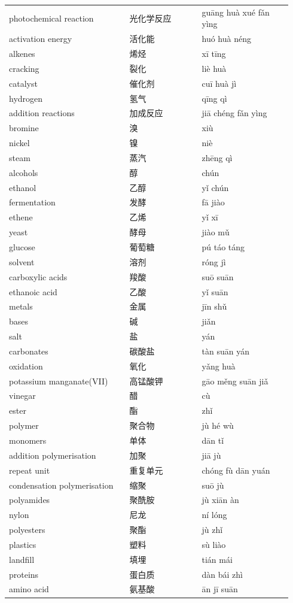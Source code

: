 \documentclass[11pt]{article}
\begin{document}
\begin{longtable}{@{}p{0.40\linewidth}p{0.24\linewidth}p{0.30\linewidth}@{}}
photochemical reaction & 光化学反应 & guāng huà xué fǎn yìng \\
activation energy & 活化能 & huó huà néng \\
alkenes & 烯烃 & xī tīng \\
cracking & 裂化 & liè huà \\
catalyst & 催化剂 & cuī huà jì \\
hydrogen & 氢气 & qīng qì \\
addition reactions & 加成反应 & jiā chéng fǎn yìng \\
bromine & 溴 & xiù \\
nickel & 镍 & niè \\
steam & 蒸汽 & zhēng qì \\
alcohols & 醇 & chún \\
ethanol & 乙醇 & yǐ chún \\
fermentation & 发酵 & fā jiào \\
ethene & 乙烯 & yǐ xī \\
yeast & 酵母 & jiào mǔ \\
glucose & 葡萄糖 & pú táo táng \\
solvent & 溶剂 & róng jì \\
carboxylic acids & 羧酸 & suō suān \\
ethanoic acid & 乙酸 & yǐ suān \\
metals & 金属 & jīn shǔ \\
bases & 碱 & jiǎn \\
salt & 盐 & yán \\
carbonates & 碳酸盐 & tàn suān yán \\
oxidation & 氧化 & yǎng huà \\
potassium manganate(VII) & 高锰酸钾 & gāo měng suān jiǎ \\
vinegar & 醋 & cù \\
ester & 酯 & zhǐ \\
polymer & 聚合物 & jù hé wù \\
monomers & 单体 & dān tǐ \\
addition polymerisation & 加聚 & jiā jù \\
repeat unit & 重复单元 & chóng fù dān yuán \\
condensation polymerisation & 缩聚 & suō jù \\
polyamides & 聚酰胺 & jù xiān àn \\
nylon & 尼龙 & ní lóng \\
polyesters & 聚酯 & jù zhǐ \\
plastics & 塑料 & sù liào \\
landfill & 填埋 & tián mái \\
proteins & 蛋白质 & dàn bái zhì \\
amino acid & 氨基酸 & ān jī suān \\
\end{longtable}
\end{document}
